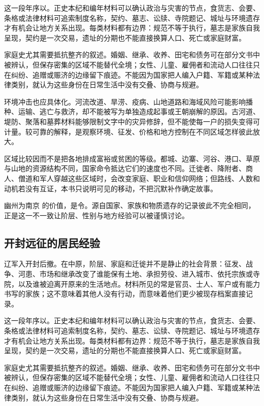 这一段年序以。正史本纪和编年材料可以确认政治与灾害的节点，食货志、会要、条格或法律材料可追索制度名称，契约、墓志、讼牍、寺院题记、城址与环境遗存才有机会让地方关系出现。每类材料都有边界：规范不等于执行，墓志是家族自我呈现，契约是一次交易，遗址的分期也不能直接换算人口、死亡或家庭财富。

家庭史尤其需要抵抗整齐的叙述。婚姻、继承、收养、田宅和债务可在部分文书中被辨认，但保存密集的区域不能替代全境；女性、儿童、雇佣者和流动人口往往只在纠纷、追赠或赈济的边缘留下痕迹。不能因为国家把人编入户籍、军籍或某种法律类别，就认为这些身份在日常生活中没有交叠、协商与规避。

环境冲击也应具体化。河流改道、旱涝、疫病、山地道路和海域风险可能影响播种、运输、逃亡与救济，却不能被写为单独造成起事或王朝崩解的原因。古河道、堤防、聚落和墓葬材料能够限制文字中的灾异修辞，但不能使每一户的损失变得可计量。较可靠的解释，是观察环境、征发、价格和地方控制在不同区域怎样彼此放大。

区域比较因而不是把各地排成富裕或贫困的等级。都城、边寨、河谷、港口、草原与山地的资源结构不同，国家命令抵达它们的速度也不同。迁徙者、降附者、商人、僧道和军人穿越这些区域时，会改变家庭、职业和信仰网络；但路线、人数和动机若没有互证，本书只说明可见的移动，不把沉默补作确定故事。

幽州为南京 的价值，是令。源自国家、家族和物质遗存的记录彼此不完全相同，正是这一不一致让阶层、性别与地方经验可以被谨慎讨论。

\subsection{开封远征的居民经验}

辽军入开封后撤。在中原，阶层、家庭和迁徙并不是静止的社会背景：征发、战争、河患、市场和继承改变了谁能保有土地、承担劳役、进入城市、依托宗族或寺院，以及谁被迫离开原来的生活地点。材料所见的常是官员、士人、军户或有能力书写的家族；这不意味着其他人没有行动，而意味着他们更少被现存档案直接记录。

这一段年序以。正史本纪和编年材料可以确认政治与灾害的节点，食货志、会要、条格或法律材料可追索制度名称，契约、墓志、讼牍、寺院题记、城址与环境遗存才有机会让地方关系出现。每类材料都有边界：规范不等于执行，墓志是家族自我呈现，契约是一次交易，遗址的分期也不能直接换算人口、死亡或家庭财富。

家庭史尤其需要抵抗整齐的叙述。婚姻、继承、收养、田宅和债务可在部分文书中被辨认，但保存密集的区域不能替代全境；女性、儿童、雇佣者和流动人口往往只在纠纷、追赠或赈济的边缘留下痕迹。不能因为国家把人编入户籍、军籍或某种法律类别，就认为这些身份在日常生活中没有交叠、协商与规避。

